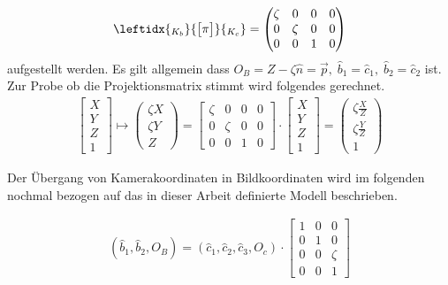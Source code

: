 		\begin{gather}
		\leftidx{_{K_{b}}}{\begin{bmatrix}
			\pi
			\end{bmatrix}}{_{K_{c}}} 
		= 
		\begin{pmatrix}
		\zeta&0&0&0\\
		0&\zeta&0&0\\
		0&0&1&0\\
		\end{pmatrix}
		\end{gather}
		 aufgestellt werden. Es gilt allgemein dass $O_B = Z - \zeta \hat{n} = \vec{p}, \; \hat{b}_1 = \hat{c}_1, \; \hat{b}_2 = \hat{c}_2$ ist. Zur Probe ob die Projektionsmatrix stimmt wird folgendes gerechnet.
		\begin{gather}
\begin{bmatrix}
X\\Y\\Z\\1
\end{bmatrix} \mapsto
\begin{pmatrix}
\zeta X\\ \zeta Y\\ Z
\end{pmatrix}
=
\begin{bmatrix}
\zeta&0&0&0\\
0&\zeta&0&0\\
0&0&1&0
\end{bmatrix}
\cdot
\begin{bmatrix}
X\\Y\\Z\\1
\end{bmatrix}
=
\begin{pmatrix}
\zeta \frac{X}{Z}\\ \zeta \frac{Y}{Z}\\1
\end{pmatrix}
\end{gather}

		Der Übergang von Kamerakoordinaten in Bildkoordinaten wird im folgenden nochmal bezogen auf das in dieser Arbeit definierte Modell beschrieben. 
		
		\begin{gather}
		(\hat{b}_1, \hat{b}_2, O_B) = (\hat{c}_1,\hat{c}_2,\hat{c}_3,O_c) \cdot 
		\begin{bmatrix}
		1&0&0\\
		0&1&0\\
		0&0&\zeta\\
		0&0&1
		\end{bmatrix}
		\end{gather}\\
		
